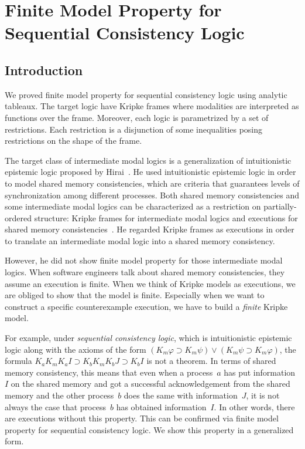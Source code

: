 \chapter{Finite Model Property for Sequential Consistency Logic}


\section{Introduction}

We proved finite model property for sequential consistency logic
using analytic tableaux.
The target logic have Kripke frames where modalities are interpreted as
functions over the frame.  Moreover, each logic is parametrized by a
set of restrictions.  Each restriction is a disjunction of some
inequalities posing restrictions on the shape of the frame.

The target class of intermediate modal logics is a generalization of
intuitionistic epistemic logic proposed by Hirai~\cite{hirailpar}.
He used intuitionistic epistemic logic in order to model shared memory
consistencies, which are criteria that guarantees levels of
synchronization among different processes.
Both shared memory consistencies and some intermediate modal logics
can be characterized as a restriction on
partially-ordered structure:
Kripke frames for intermediate modal logics
and executions for shared memory
consistencies~\cite{steinke2004unified}.
He regarded Kripke frames as executions in order to translate
an intermediate modal logic into a shared memory
consistency.

However, he did not show finite model property for those
intermediate modal logics.  When software engineers talk about shared
memory consistencies, they assume an execution is finite.
When we think of Kripke models as executions, we are obliged to show
that the model is finite.
Especially when we want to construct a specific counterexample execution,
we have to build a \textit{finite} Kripke model.

For example,
under \textit{sequential consistency logic}, which is intuitionistic epistemic
logic along with the axioms of the form
$(K_m\varphi\supset K_m\psi) \vee (K_m\psi\supset K_m\varphi)$,
the formula $K_aK_mK_aI \supset K_bK_mK_bJ\supset K_bI$ is not a
theorem.
In terms of shared memory consistency, this means that even when a
process~$a$ has put information~$I$ on the shared memory and got a
successful acknowledgement from the shared memory and the other
process~$b$ does the same with information~$J$, it is not always the
case that process~$b$ has obtained information~$I$\kern -2pt.
In other words, there are executions without this property.
This can be confirmed via
finite model property for sequential consistency logic.
We show this property in a generalized form.

